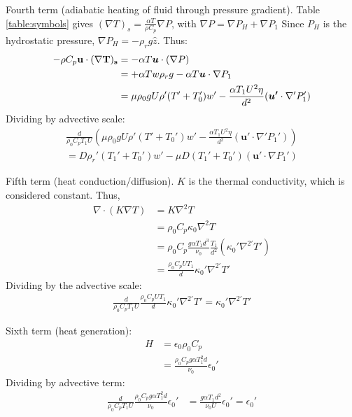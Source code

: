 \documentclass[document.tex]{subfiles}
\begin{document}
\begin{mdframed}
    Fourth term (adiabatic heating of fluid through pressure gradient). Table \ref{table:symbols} gives $(\nabla T)_s = \frac{\alpha T}{\rho C_p}\nabla P$, with $\nabla P = \nabla P_H + \nabla P_1$ 
    Since $P_H$ is the hydrostatic pressure, $\nabla P_H = -\rho_r g \hat{z}$. Thus: 
    \begin{align*}
        -\rho C_p \bf{u} \cdot (\nabla T)_s &= -\alpha T \bm{u} \cdot (\nabla P)\\
        &= +\alpha T w \rho_r g - \alpha T \bm{u} \cdot \nabla P_1\\
        &= \mu \rho_0gU\rho'(T'+T_0')w' - \frac{\alpha T_1 U^2 \eta}{d^2} (\bm{u'}\cdot \nabla'P_1') \\
    \end{align*} 
Dividing by advective scale: 
\begin{align*}
    \frac{d}{\rho_0C_p T_1 U} \left(\mu \rho_0gU\rho'(T'+T_0')w' - \frac{\alpha T_1 U^2 \eta}{d^2} (\bm{u'}\cdot \nabla'P_1')\right) \\
    = D \rho_r'(T_1'+T_0')w' - \mu D (T_1'+T_0')(\bm{u'}\cdot\nabla P_1') 
\end{align*}
\end{mdframed}
\begin{mdframed}
    Fifth term (heat conduction/diffusion). $K$ is the thermal conductivity, which is considered constant. Thus, 
    \begin{align*}
        \nabla \cdot (K\nabla T) &= K\nabla^2T\\
        &= \rho_0 C_p \kappa_0  \nabla^2 T\\
        &= \rho_0 C_p \frac{g\alpha T_1 d^3}{\nu_0} \frac{T_1}{d^2} (\kappa_0' \nabla^{2'}T') \\
        &= \frac{\rho_0C_pUT_1}{d}\kappa_0' \nabla^{2'}T'
    \end{align*}
    Dividing by the advective scale: 
    \begin{align*}
        \frac{d}{\rho_0C_p T_1 U} \frac{\rho_0C_pUT_1}{d}\kappa_0' \nabla^{2'}T' = \kappa_0' \nabla^{2'}T' 
    \end{align*}
\end{mdframed}

\begin{mdframed}
    Sixth term (heat generation): 
    \begin{align*}
        H &= \epsilon_0\rho_0C_p\\
        &= \frac{\rho_0C_p g \alpha T_1^2d}{\nu_0}\epsilon_0'
    \end{align*}
    Dividing by advective term: 
    \begin{align*}
        \frac{d}{\rho_0C_p T_1 U}  \frac{\rho_0C_p g \alpha T_1^2d}{\nu_0}\epsilon_0' &= \frac{g\alpha T_1 d^2 }{\nu_0 U} \epsilon_0' = \epsilon_0'
    \end{align*}
\end{mdframed}
\end{document}
